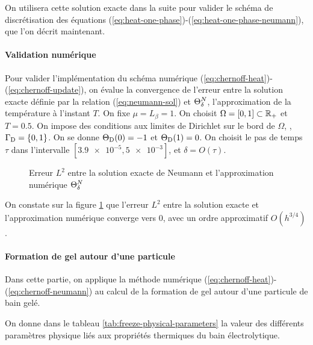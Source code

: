 On utilisera cette solution exacte dans la suite pour valider le schéma de
discrétisation des équations
(\ref{eq:heat-one-phase})-(\ref{eq:heat-one-phase-neumann}), que l'on
décrit maintenant.

\paragraph{Validation numérique}
Pour valider l'implémentation du schéma numérique
(\ref{eq:chernoff-heat})-(\ref{eq:chernoff-update}), on évalue la
convergence de l'erreur entre la solution exacte définie par la
relation (\ref{eq:neumann-sol}) et $\Theta^N_\delta$,
l'approximation de la température à l'instant $T$. On fixe $\mu =
L_\beta = 1$. On choisit $\Omega = [0, 1] \subset \mathbb R_+$ et $T =
0.5$. On impose des conditions aux limites de Dirichlet sur le bord de
$\Omega$, \ie, $\Gamma_\mathrm{D} = \left\{ 0, 1 \right\}$. On se donne
$\Theta_\mathrm{D}(0) = -1$ et $\Theta_\mathrm{D}(1) =
0$. On choisit le pas de temps $\tau$ dans l'intervalle
$[\num{3.9e-5}, \num{5e-3}]$, et $\delta = O(\tau)$.

\begin{figure}
  \begin{center}
    
    \caption{Erreur $L^2$ entre la solution exacte de Neumann et
      l'approximation numérique $\Theta^N_\delta$}
    \label{fig:neumann-convergence}
  \end{center}
\end{figure}

On constate sur la figure \ref{fig:neumann-convergence} que l'erreur
$L^2$ entre la solution exacte et l'approximation numérique converge
vers 0, avec un ordre approximatif $O(h^{3/4})$.




\paragraph{Formation de gel autour d'une particule}
Dans cette partie, on applique la méthode numérique
(\ref{eq:chernoff-heat})-(\ref{eq:chernoff-neumann}) au calcul de
la formation de gel autour d'une particule de bain gelé.

On donne dans le tableau \ref{tab:freeze-physical-parameters} la
valeur des différents paramètres physique liés aux propriétés
thermiques du bain électrolytique.

